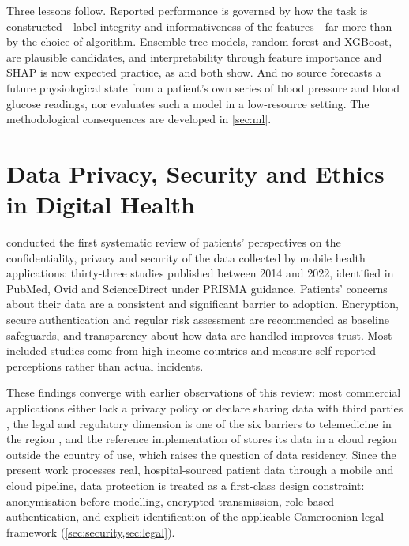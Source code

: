 \documentclass[12pt,a4paper,oneside]{report}
\begin{document}
Three lessons follow. Reported performance is governed by how the task is constructed---label integrity and informativeness of the features---far more than by the choice of algorithm. Ensemble tree models, random forest and XGBoost, are plausible candidates, and interpretability through feature importance and SHAP is now expected practice, as \textcite{mendoza2025} and \textcite{liu2025ppg} both show. And no source forecasts a future physiological state from a patient's own series of blood pressure and blood glucose readings, nor evaluates such a model in a low-resource setting. The methodological consequences are developed in \cref{sec:ml}.

\section{Data Privacy, Security and Ethics in Digital Health}\label{sec:lr-privacy}

\Textcite{alhammad2024} conducted the first systematic review of patients' perspectives on the confidentiality, privacy and security of the data collected by mobile health applications: thirty-three studies published between 2014 and 2022, identified in PubMed, Ovid and ScienceDirect under PRISMA guidance. Patients' concerns about their data are a consistent and significant barrier to adoption. Encryption, secure authentication and regular risk assessment are recommended as baseline safeguards, and transparency about how data are handled improves trust. Most included studies come from high-income countries and measure self-reported perceptions rather than actual incidents.

These findings converge with earlier observations of this review: most commercial applications either lack a privacy policy or declare sharing data with third parties \parencite{alessa2019}, the legal and regulatory dimension is one of the six barriers to telemedicine in the region \parencite{dodoo2022}, and the reference implementation of \textcite{efendi2025} stores its data in a cloud region outside the country of use, which raises the question of data residency. Since the present work processes real, hospital-sourced patient data through a mobile and cloud pipeline, data protection is treated as a first-class design constraint: anonymisation before modelling, encrypted transmission, role-based authentication, and explicit identification of the applicable Cameroonian legal framework (\cref{sec:security,sec:legal}).
\end{document}
